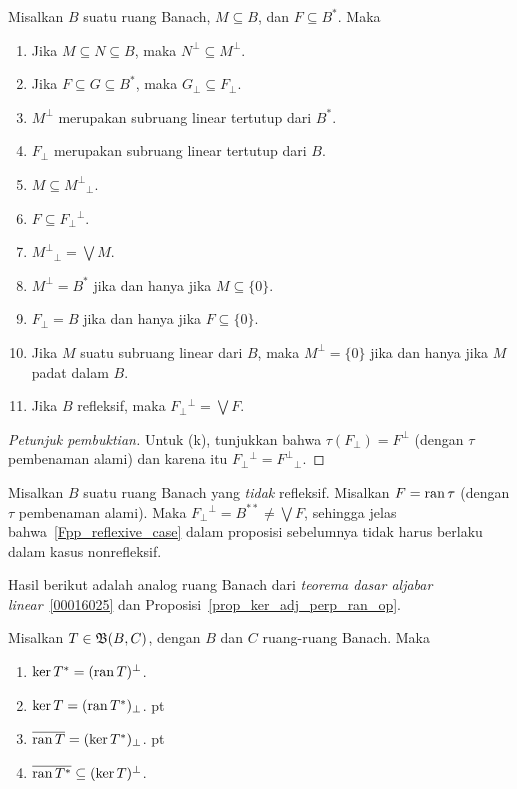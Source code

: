 \begin{prop}[Anihilator]  Misalkan $B$ suatu ruang Banach, $M \subseteq B$, dan $F \subseteq B^*$. Maka
 \begin{enumerate}[label=\rm{(\alph*)}]
  \item Jika $M \subseteq N \subseteq B$, maka $N^\perp \subseteq M^\perp$.
  \item Jika $F \subseteq G \subseteq B^*$, maka $G_\perp \subseteq F_\perp$.
  \item $M^\perp$ merupakan subruang linear tertutup dari $B^*$.
  \item $F_\perp$ merupakan subruang linear tertutup dari $B$.
  \item $M \subseteq M^\perp{}_\perp$.
  \item $F \subseteq F_\perp{}^\perp$.
  \item $M^\perp{}_\perp = \bigvee M$.
  \item $M^\perp = B^*$ jika dan hanya jika $M \subseteq \{0\}$.
  \item $F_\perp = B$ jika dan hanya jika $F \subseteq \{0\}$.
  \item Jika $M$ suatu subruang linear dari $B$, maka $M^\perp = \{0\}$ jika dan hanya jika $M$
padat dalam $B$.
  \item\label{Fpp_reflexive_case} Jika $B$ refleksif, maka $F_\perp{}^\perp = \bigvee F$.
 \end{enumerate}
\end{prop}

\begin{proof}[\emph{Petunjuk pembuktian}] Untuk (k), tunjukkan bahwa $\tau(F_\perp) = F^\perp$ (dengan $\tau$
pembenaman alami) dan karena itu $F_\perp{}^\perp = F^\perp{}_\perp$.  \ns
\end{proof}

\begin{exam} Misalkan $B$ suatu ruang Banach yang \emph{tidak} refleksif.  Misalkan $F = \operatorname{ran} \tau$ (dengan $\tau$
pembenaman alami).  Maka $F_\perp{}^\perp = B^{**} \ne \bigvee F$, sehingga jelas bahwa~\ref{Fpp_reflexive_case}
dalam proposisi sebelumnya tidak harus berlaku dalam kasus nonrefleksif.
\end{exam}

Hasil berikut adalah analog ruang Banach dari \emph{teorema dasar aljabar linear}~\ref{00016025} dan
Proposisi~\ref{prop_ker_adj_perp_ran_op}.

\begin{prop}\label{prop_FTLA_Bsp} Misalkan $T \in \mathfrak{B}(B,C)$, dengan $B$ dan $C$ ruang-ruang Banach. Maka
 \begin{enumerate}[label=\rm{(\alph*)}]
  \item $\ker T^\ast = (\operatorname{ran} T)^\perp$.
  \item $\ker T = (\operatorname{ran} T^*)_\perp$.
 pt
  \item $\overline{\operatorname{ran} T} = (\ker T^*)_\perp$.
 pt
  \item $\overline{\operatorname{ran} T^*} \subseteq (\ker T)^\perp$.
 \end{enumerate}
\end{prop}

